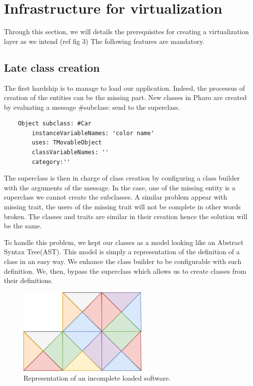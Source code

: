 \documentclass[sigplan,review,anonymous]{acmart}\settopmatter{printfolios=true,printccs=false,printacmref=false}
\begin{document}
%
\section{Infrastructure for virtualization}
Through this section, we will details the prerequisites for creating a virtualization layer as we intend (ref fig 3)
The following features are mandatory.

\subsection{Late class creation}
The first hardship is to manage to load our application.
Indeed, the processus of creation of the entities can be the missing part.  
New classes in Pharo are created by evaluating a message \#subclass: send to the superclass.
\begin{verbatim}
    Object subclass: #Car
        instanceVariableNames: 'color name'
        uses: TMovableObject
        classVariableNames: ''
        category:''
\end{verbatim}
The superclass is then in charge of class creation by configuring a class builder with the arguments of the message.
In the case, one of the missing entity is a superclass we cannot create the subclasses.
A similar problem appear with missing trait, the users of the missing trait will not be complete in other words broken. The classes and traits are similar in their creation hence the solution will be the same.

To handle this problem, we kept our classes as a model looking like an Abstract Syntax Tree(AST).
This model is simply a representation of the definition of a class in an easy way.
We enhance the class builder to be configurable with such definition.
We, then, bypass the superclass which allows us to create classes from their definitions.
	\begin{figure}[H]
       \centering
       \includegraphics[scale=0.25]{Images/IncompleteSoftware.png}
        \caption{Representation of an incomplete loaded software.}
	\end{figure}
\end{document}
